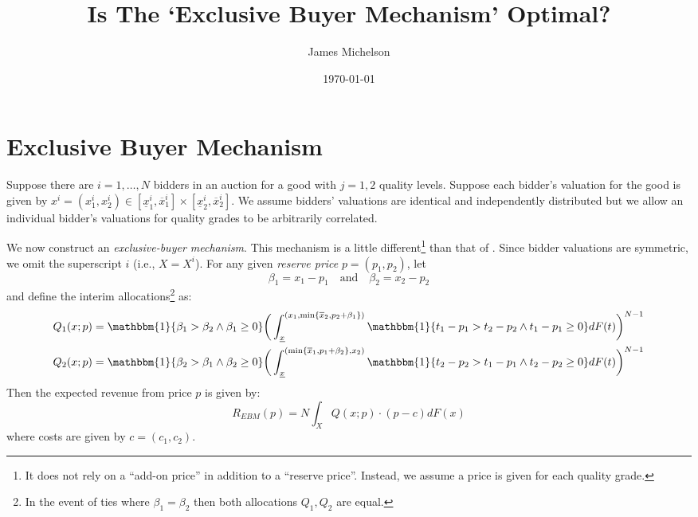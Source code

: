 \documentclass{article}
\title{Is The `Exclusive Buyer Mechanism' Optimal?}
\author{James Michelson}
\date{\today}
\begin{document}
\section{Exclusive Buyer Mechanism}

Suppose there are $i=1,\dots,N$ bidders in an auction for a good with $j=1,2$ quality levels. Suppose each bidder's valuation for the good is given by $x^i = (x_1^i,x_2^i) \in [\underline{x}_1^i, \overline{x}_1^i] \times [\underline{x}_2^i, \overline{x}_2^i]$. We assume bidders' valuations are identical and independently distributed but we allow an individual bidder's valuations for quality grades to be arbitrarily correlated. 

We now construct an \textit{exclusive-buyer mechanism}. This mechanism is a little different\footnote{It does not rely on a ``add-on price'' in addition to a ``reserve price''. Instead, we assume a price is given for each quality grade.} than that of \autocite{belloni2010multidimensional}. Since bidder valuations are symmetric, we omit the superscript $i$ (i.e., $X = X^i$). For any given \textit{reserve price} $p=(p_1,p_2)$, let
\begin{equation}
    \beta_1 = x_1 - p_1 \quad \text{and} \quad \beta_2 = x_2 - p_2
\end{equation}
and define the interim allocations\footnote{In the event of ties where $\beta_1 = \beta_2$ then both allocations $Q_1,Q_2$ are equal.} as:
\begin{align}
    Q_1(x;p) &= \mathbbm{1}\{ \beta_1 > \beta_2 \land \beta_1 \geq 0 \} \bigg( \int_{\underline{x}}^{(x_1, \min\{\overline{x}_2, p_2 + \beta_1 \})} \mathbbm{1}\{ t_1 - p_1 > t_2 - p_2 \land t_1 - p_1 \geq 0 \} dF(t) \bigg)^{N-1} \\
    Q_2(x;p) &= \mathbbm{1}\{ \beta_2 > \beta_1 \land \beta_2 \geq 0 \} \bigg( \int_{\underline{x}}^{(\min\{\overline{x}_1, p_1 + \beta_2 \},x_2)} \mathbbm{1}\{ t_2 - p_2 > t_1 - p_1 \land t_2 - p_2 \geq 0 \} dF(t) \bigg)^{N-1}
\end{align}
\noindent Then the expected revenue from price $p$ is given by:
\begin{equation}
    R_{EBM}(p) = N \int_X Q(x;p) \cdot  (p - c) dF(x)
\end{equation}
\noindent where costs are given by $c = (c_1,c_2)$.

\end{document}
